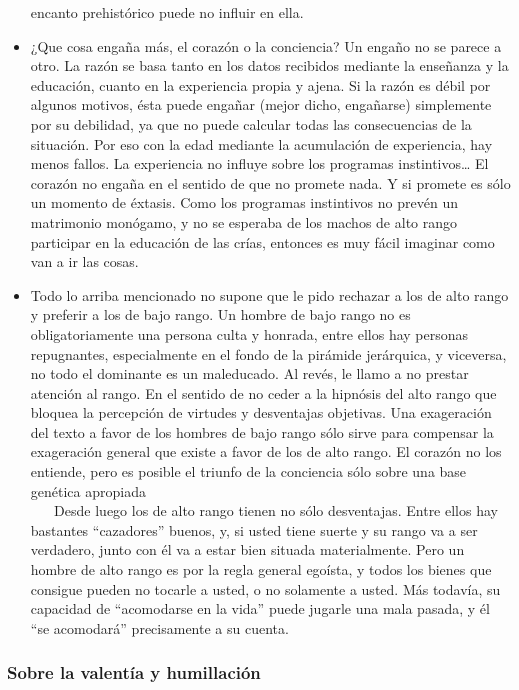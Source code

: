 \begin{itemize}
  encanto prehistórico puede no influir en ella.
\item
  ¿Que cosa engaña más, el corazón o la conciencia? Un engaño no se
  parece a otro. La razón se basa tanto en los datos recibidos mediante
  la enseñanza y la educación, cuanto en la experiencia propia y ajena.
  Si la razón es débil por algunos motivos, ésta puede engañar (mejor
  dicho, engañarse) simplemente por su debilidad, ya que no puede
  calcular todas las consecuencias de la situación. Por eso con la edad
  mediante la acumulación de experiencia, hay menos fallos. La
  experiencia no influye sobre los programas instintivos\ldots{} El
  corazón no engaña en el sentido de que no promete nada. Y si promete
  es sólo un momento de éxtasis. Como los programas instintivos no
  prevén un matrimonio monógamo, y no se esperaba de los machos de alto
  rango participar en la educación de las crías, entonces es muy fácil
  imaginar como van a ir las cosas.
\item
  Todo lo arriba mencionado no supone que le pido rechazar a los de alto
  rango y preferir a los de bajo rango. Un hombre de bajo rango no es
  obligatoriamente una persona culta y honrada, entre ellos hay personas
  repugnantes, especialmente en el fondo de la pirámide jerárquica, y
  viceversa, no todo el dominante es un maleducado. Al revés, le llamo a
  no prestar atención al rango. En el sentido de no ceder a la hipnósis
  del alto rango que bloquea la percepción de virtudes y desventajas
  objetivas. Una exageración del texto a favor de los hombres de bajo
  rango sólo sirve para compensar la exageración general que existe a
  favor de los de alto rango. El corazón no los entiende, pero es
  posible el triunfo de la conciencia sólo sobre una base genética
  apropiada\\
  \hspace*{0.333em} ~ ~ Desde luego los de alto rango tienen no sólo
  desventajas. Entre ellos hay bastantes ``cazadores'' buenos, y, si
  usted tiene suerte y su rango va a ser verdadero, junto con él va a
  estar bien situada materialmente. Pero un hombre de alto rango es por
  la regla general egoísta, y todos los bienes que consigue pueden no
  tocarle a usted, o no solamente a usted. Más todavía, su capacidad de
  ``acomodarse en la vida'' puede jugarle una mala pasada, y él ``se
  acomodará'' precisamente a su cuenta.
\end{itemize}

\protect\hypertarget{M19}{}{}

\hypertarget{sobre-la-valentuxeda-y-humillaciuxf3n}{\subsubsection{Sobre
la valentía y humillación}\label{sobre-la-valentuxeda-y-humillaciuxf3n}}

